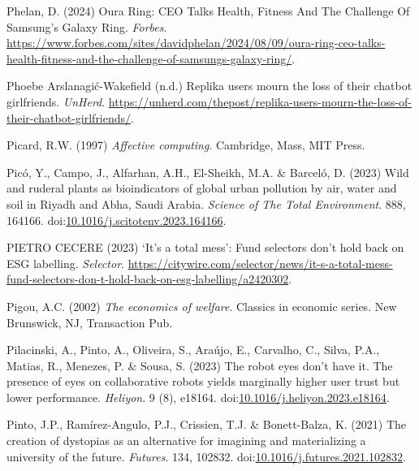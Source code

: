 \documentclass[
  letterpaper,
  DIV=11,
  numbers=noendperiod]{scrartcl}
\newlength{\cslhangindent}
\newenvironment{CSLReferences}[2] %
 {\begin{list}{}{%
  \setlength{\itemindent}{0pt}
  \setlength{\leftmargin}{0pt}
  \setlength{\parsep}{0pt}
  \ifodd #1
   \setlength{\leftmargin}{\cslhangindent}
   \setlength{\itemindent}{-1\cslhangindent}
  \fi
  \setlength{\itemsep}{#2\baselineskip}}}
 {\end{list}}
\begin{document}
\begin{CSLReferences}{0}{1}
Phelan, D. (2024) Oura {Ring}: {CEO Talks Health}, {Fitness And The
Challenge Of Samsung}'s {Galaxy Ring}. \emph{Forbes}.
\url{https://www.forbes.com/sites/davidphelan/2024/08/09/oura-ring-ceo-talks-health-fitness-and-the-challenge-of-samsungs-galaxy-ring/}.

Phoebe Arslanagić-Wakefield (n.d.) Replika users mourn the loss of their
chatbot girlfriends. \emph{UnHerd}.
\url{https://unherd.com/thepost/replika-users-mourn-the-loss-of-their-chatbot-girlfriends/}.

Picard, R.W. (1997) \emph{Affective computing}. Cambridge, Mass, MIT
Press.

Picó, Y., Campo, J., Alfarhan, A.H., El-Sheikh, M.A. \& Barceló, D.
(2023) Wild and ruderal plants as bioindicators of global urban
pollution by air, water and soil in {Riyadh} and {Abha}, {Saudi Arabia}.
\emph{Science of The Total Environment}. 888, 164166.
doi:\href{https://doi.org/10.1016/j.scitotenv.2023.164166}{10.1016/j.scitotenv.2023.164166}.

PIETRO CECERE (2023) {`{It}'s a total mess'}: {Fund} selectors don't
hold back on {ESG} labelling. \emph{Selector}.
\url{https://citywire.com/selector/news/it-s-a-total-mess-fund-selectors-don-t-hold-back-on-esg-labelling/a2420302}.

Pigou, A.C. (2002) \emph{The economics of welfare}. Classics in economic
series. New Brunswick, NJ, Transaction Pub.

Pilacinski, A., Pinto, A., Oliveira, S., Araújo, E., Carvalho, C.,
Silva, P.A., Matias, R., Menezes, P. \& Sousa, S. (2023) The robot eyes
don't have it. {The} presence of eyes on collaborative robots yields
marginally higher user trust but lower performance. \emph{Heliyon}. 9
(8), e18164.
doi:\href{https://doi.org/10.1016/j.heliyon.2023.e18164}{10.1016/j.heliyon.2023.e18164}.

Pinto, J.P., Ramírez-Angulo, P.J., Crissien, T.J. \& Bonett-Balza, K.
(2021) The creation of dystopias as an alternative for imagining and
materializing a university of the future. \emph{Futures}. 134, 102832.
doi:\href{https://doi.org/10.1016/j.futures.2021.102832}{10.1016/j.futures.2021.102832}.


\end{CSLReferences}
\end{document}
